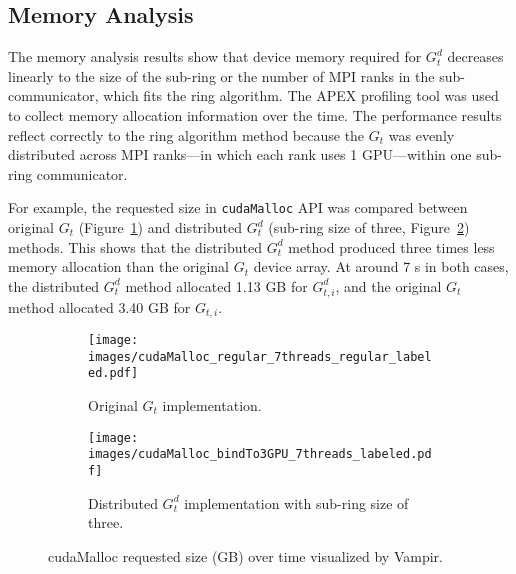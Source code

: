 \subsection{Memory Analysis}
\label{subsec:memory_analysis}
The memory analysis results show that device memory required for $G^d_t$ decreases linearly to the size of the sub-ring or the number of MPI ranks in the sub-communicator, which fits
the ring algorithm.
%
The APEX profiling tool was used to collect memory allocation information over the time.
%
The performance results reflect correctly to the ring algorithm method because the $G_t$ was evenly distributed across MPI ranks---in which each rank uses 1 GPU---within one sub-ring communicator. 

%
For example, the requested size in \texttt{cudaMalloc} API was compared between original $G_t$ (Figure~\ref{fig:regular_g4}) and distributed $G^d_t$ 
(sub-ring size of three, Figure~\ref{fig:distributed_g4_bind3GPU}) methods. 
%
This shows that the distributed $G^d_t$ method produced three times less memory allocation 
than the original $G_t$ device array. 
%
At around 7 s in both cases, the distributed $G^d_t$ method allocated 
1.13 GB for $G^d_{t,i}$, and the original $G_t$ method allocated 
3.40 GB for $G_{t,i}$. 



\begin{figure}
\centering
     \begin{subfigure}[b]{\columnwidth}
         \centering
         \texttt{[image: images/cudaMalloc\_regular\_7threads\_regular\_labeled.pdf]}
         \caption{Original $G_t$ implementation.}
         \label{fig:regular_g4}
     \end{subfigure}
     
    \begin{subfigure}[b]{\columnwidth}
         \centering
         \texttt{[image: images/cudaMalloc\_bindTo3GPU\_7threads\_labeled.pdf]}
         \caption{Distributed $G^d_t$ implementation with sub-ring size of three.}
         \label{fig:distributed_g4_bind3GPU}
     \end{subfigure}
     
\caption{cudaMalloc requested size (GB) over time visualized by Vampir.}
\label{fig:cudaMalloc}
\end{figure}

